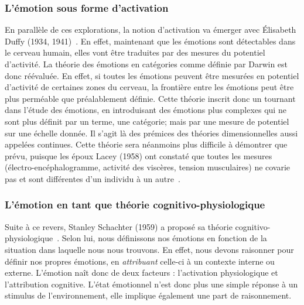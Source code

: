 \subsubsection{L'émotion sous forme d'activation}
En parallèle de ces explorations, la notion d'activation va émerger avec Élisabeth Duffy (1934, 1941)~\cite{Duffy1934,Duffy1941}. En effet, maintenant que les émotions sont détectables dans le cerveau humain, elles vont être traduites par des mesures du potentiel d'activité. La théorie des émotions en catégories comme définie par Darwin est donc réévaluée. En effet, si toutes les émotions peuvent être mesurées en potentiel d'activité de certaines zones du cerveau, la frontière entre les émotions peut être plus perméable que préalablement définie. Cette théorie inscrit donc un tournant dans l'étude des émotions, en introduisant des émotions plus complexes qui ne sont plus définit par un terme, une catégorie; mais par une mesure de potentiel sur une échelle donnée. Il s'agit là des prémices des théories dimensionnelles aussi appelées continues.
Cette théorie sera néanmoins plus difficile à démontrer que prévu, puisque les époux Lacey (1958) ont constaté que toutes les mesures (électro-encéphalogramme, activité des viscères, tension musculaires) ne covarie pas et sont différentes d'un individu à un autre~\cite{Lacey1958}.

\subsubsection{L'émotion en tant que théorie cognitivo-physiologique}
Suite à ce revers, Stanley Schachter (1959) a proposé sa théorie cognitivo-physiologique~\cite{Schachter1959,Schachter1962}. Selon lui, nous définissons nos émotions en fonction de la situation dans laquelle nous nous trouvons. En effet, nous devons raisonner pour définir nos propres émotions, en \textit{attribuant} celle-ci à un contexte interne ou externe. L'émotion naît donc de deux facteurs : l'activation physiologique et l'attribution cognitive. L'état émotionnel n'est donc plus une simple réponse à un stimulus de l'environnement, elle implique également une part de raisonnement.

